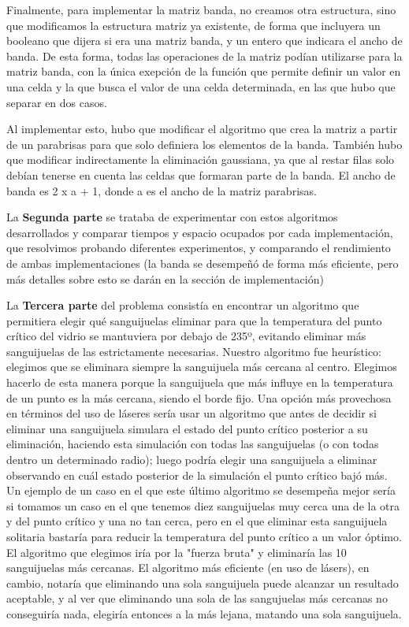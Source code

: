 \documentclass[spanish,a4paper]{article}
\begin{document}
Finalmente, para implementar la matriz banda, no creamos otra estructura, sino que modificamos la estructura matriz ya existente, de forma que incluyera un booleano que dijera si era una matriz banda, y un entero que indicara el ancho de banda. De esta forma, todas las operaciones de la matriz podían utilizarse para la matriz banda, con la única exepción de la función que permite definir un valor en una celda y la que busca el valor de una celda determinada, en las que hubo que separar en dos casos.

Al implementar esto, hubo que modificar el algoritmo que crea la matriz a partir de un parabrisas para que solo definiera los elementos de la banda. También hubo que modificar indirectamente la eliminación gaussiana, ya que al restar filas solo debían tenerse en cuenta las celdas que formaran parte de la banda. El ancho de banda es 2 x a + 1, donde a es el ancho de la matriz parabrisas.

La \textbf{Segunda parte} se trataba de experimentar con estos algoritmos desarrollados y comparar tiempos y espacio ocupados por cada implementación, que resolvimos probando diferentes experimentos, y comparando el rendimiento de ambas implementaciones (la banda se desempeñó de forma más eficiente, pero más detalles sobre esto se darán en la sección de implementación)\newline \newline

La \textbf{Tercera parte} del problema consistía en encontrar un algoritmo que permitiera elegir qué sanguijuelas eliminar para que la temperatura del punto crítico del vidrio se mantuviera por debajo de 235º, evitando eliminar más sanguijuelas de las estrictamente necesarias. Nuestro algoritmo fue heurístico: elegimos que se eliminara siempre la sanguijuela más cercana al centro. Elegimos hacerlo de esta manera porque la sanguijuela que más influye en la temperatura de un punto es la más cercana, siendo el borde fijo.\newline
Una opción más provechosa en términos del uso de láseres sería usar un algoritmo que antes de decidir si eliminar una sanguijuela simulara el estado del punto crítico posterior a su eliminación, haciendo esta simulación con todas las sanguijuelas (o con todas dentro un determinado radio); luego podría elegir una sanguijuela a eliminar observando en cuál estado posterior de la simulación el punto crítico bajó más.
Un ejemplo de un caso en el que este último algoritmo se desempeña mejor sería si tomamos un caso en el que tenemos diez sanguijuelas muy cerca una de la otra y del punto crítico y una no tan cerca, pero en el que eliminar esta sanguijuela solitaria bastaría para reducir la temperatura del punto crítico a un valor óptimo.
El algoritmo que elegimos iría por la "fuerza bruta" y eliminaría las 10 sanguijuelas más cercanas.
El algoritmo más eficiente (en uso de lásers), en cambio, notaría que eliminando una sola sanguijuela puede alcanzar un resultado aceptable, y al ver que eliminando una sola de las sangujuelas más cercanas no conseguiría nada, elegiría entonces a la más lejana, matando una sola sanguijuela.
\end{document}
